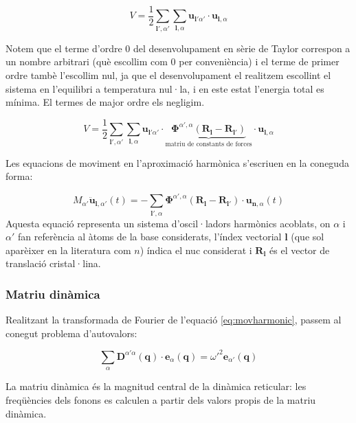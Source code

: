 \documentclass[12pt]{article} %
\let\vec\mathbf %
\begin{document}
\begin{equation}
 V=\frac{1}{2}\sum_{\vec l',\alpha'}\sum_{\vec l,\alpha}\vec u_{\vec l'\alpha'}\cdot\vec u_{\vec l,\alpha}
\end{equation}

Notem que el terme d'ordre $0$ del desenvolupament en sèrie de Taylor correspon a un nombre arbitrari (què escollim com $0$ per conveniència) i el terme de primer ordre tambè l'escollim nul, ja que el desenvolupament el realitzem escollint el sistema en l'equilibri a temperatura nul·la, i en este estat l'energia total es mínima. El termes de major ordre els negligim.

\begin{equation}
 V=\frac{1}{2}\sum_{\vec l',\alpha'}\sum_{\vec l,\alpha}\vec u_{\vec l'\alpha'}\cdot\underbrace{\vec\Phi^{\alpha',\alpha}(\vec R_{\vec l}-\vec R_{\vec l'})}_\text{matriu de constants de forces}\cdot\vec u_{\vec l,\alpha}
\end{equation}

Les equacions de moviment en l'aproximació harmònica s'escriuen en la coneguda forma:

\begin{equation}
\label{eq:movharmonic}
 M_{\alpha'}\vec{\ddot{u}}_{\vec l,\alpha'}(t)=-\sum_{\vec l',\alpha}\vec\Phi^{\alpha',\alpha}\left(\vec R_\vec l-\vec R_{\vec l'}\right)\cdot\vec u_{\vec n,\alpha}(t)
\end{equation}
 Aquesta equació representa un sistema  d'oscil·ladors harmònics acoblats, on $\alpha$ i $\alpha'$ fan referència al àtoms de la base considerats, l'índex vectorial $\vec l$ (que sol aparèixer en la literatura com $n$) índica el nuc considerat i $\vec R_\vec l$ és el vector de translació cristal·lina.
 
\subsubsection{Matriu dinàmica}
Realitzant la transformada de Fourier de l'equació \ref{eq:movharmonic}, passem al conegut problema d'autovalors:

\begin{equation}
\sum_{\alpha}\vec D^{\alpha'\alpha}(\vec q)\cdot\vec e_{\alpha}(\vec q)={\omega'}^{2}\vec e_{\alpha'}(\vec q)
\end{equation}   

La matriu dinàmica és la magnitud central de la dinàmica reticular: les freqüències dels fonons es calculen a partir dels valors propis de la matriu dinàmica.
\end{document}
